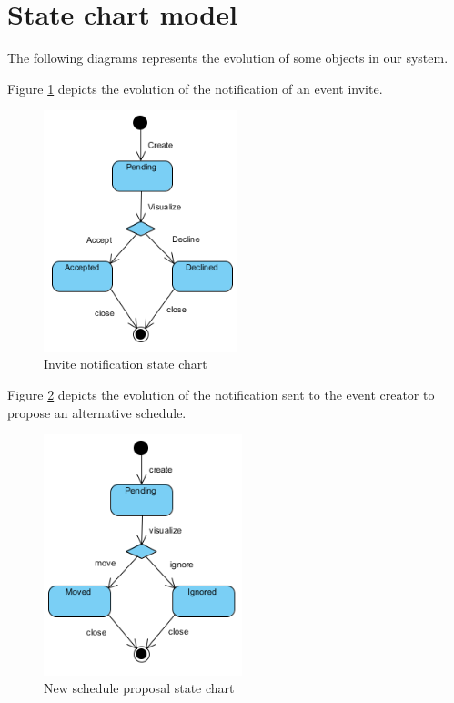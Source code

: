 \documentclass[10pt,a4paper,titlepage]{article}
\begin{document}
\section{State chart model}
The following diagrams represents the evolution of some objects in our system.

Figure \ref{fig:InviteStateChart} depicts the evolution of the notification of an event invite.
\begin{figure}[h!]
\centering
\includegraphics[height=7cm]{./Uml/StateDiagram_invite.png}
\caption[InviteStateChart]{Invite notification state chart}
\label{fig:InviteStateChart}
\end{figure}

Figure \ref{fig:3DayStateChart} depicts the evolution of the notification sent to the event creator to propose an alternative schedule.
\begin{figure}[h!]
\centering
\includegraphics[height=7cm]{./Uml/StateDiagram_3day.png}
\caption[3DayStateChart]{New schedule proposal state chart}
\label{fig:3DayStateChart}
\end{figure}
\end{document}
